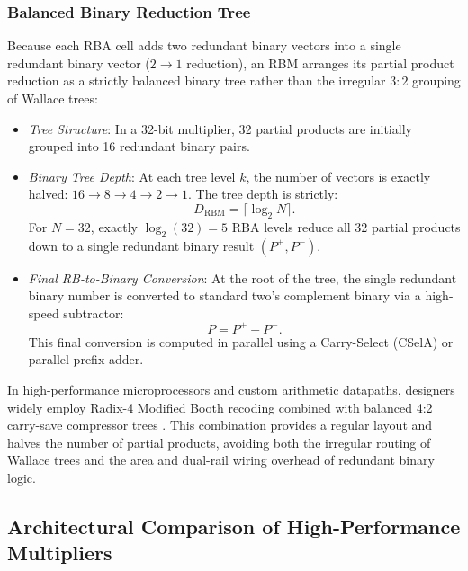 \subsubsection{Balanced Binary Reduction Tree}
Because each RBA cell adds two redundant binary vectors into a single redundant binary vector ($2 \to 1$ reduction), an RBM arranges its partial product reduction as a strictly balanced binary tree rather than the irregular $3:2$ grouping of Wallace trees:
\begin{itemize}
    \item \textit{Tree Structure}: In a 32-bit multiplier, 32 partial products are initially grouped into 16 redundant binary pairs.
    
    \item \textit{Binary Tree Depth}: At each tree level $k$, the number of vectors is exactly halved: $16 \to 8 \to 4 \to 2 \to 1$. The tree depth is strictly:
    \begin{equation}
    D_{\text{RBM}} = \lceil \log_2 N \rceil.
    \end{equation}
    For $N = 32$, exactly $\log_2(32) = 5$ RBA levels reduce all 32 partial products down to a single redundant binary result $(P^+, P^-)$.
    
    \item \textit{Final RB-to-Binary Conversion}: At the root of the tree, the single redundant binary number is converted to standard two's complement binary via a high-speed subtractor:
    \begin{equation}
    P = P^+ - P^-.
    \end{equation}
    This final conversion is computed in parallel using a Carry-Select (CSelA) or parallel prefix adder.
\end{itemize}


In high-performance microprocessors and custom arithmetic datapaths, designers widely employ Radix-4 Modified Booth recoding combined with balanced 4:2 carry-save compressor trees \cite{santoro1989, goto1992, ohkubo1995}. This combination provides a regular layout and halves the number of partial products, avoiding both the irregular routing of Wallace trees and the area and dual-rail wiring overhead of redundant binary logic.

\subsection{Architectural Comparison of High-Performance Multipliers}

